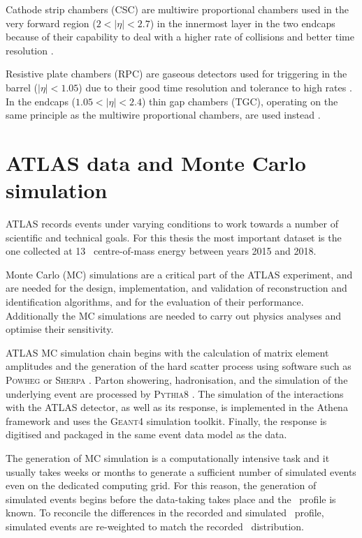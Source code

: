 Cathode strip chambers (CSC) are multiwire proportional chambers
used in the very forward region ($2 < |\eta| < 2.7$)
in the innermost layer in the two endcaps because of their capability
to deal with a higher rate of collisions and better time resolution
\cite{Aad:2010ag}.

Resistive plate chambers (RPC) are gaseous detectors used for
triggering in the barrel ($|\eta| < 1.05$) due to their good time resolution
and tolerance to high rates \cite{Cattani_2011}. In the endcaps ($1.05 < |\eta| < 2.4$)
thin gap chambers (TGC), operating on the same principle as the multiwire
proportional chambers, are used instead \cite{Nagai:1996mf}.

\section{ATLAS data and Monte Carlo simulation}

ATLAS records events under varying conditions to work towards a number of
scientific and technical goals. For this thesis the most important dataset
is the one collected at 13 \TeV~centre-of-mass energy between years 2015
and 2018.

Monte Carlo (MC) simulations are a critical part of the ATLAS experiment,
and are needed for the design, implementation, and validation of
reconstruction and identification algorithms, and for the evaluation
of their performance. Additionally the MC simulations are needed to
carry out physics analyses and optimise their sensitivity.

ATLAS MC simulation chain begins with the calculation of matrix element 
amplitudes and the generation of the hard scatter process using
software such as \textsc{Powheg} \cite{powheg, Frixione_2007, Alioli_2010}
or \textsc{Sherpa} \cite{sherpa1, sherpa2}. Parton showering, hadronisation,
and the simulation of the underlying event are processed by
\textsc{Pythia8} \cite{Sj_strand_2008}. The simulation of the
interactions with the ATLAS detector, as well as its response, is
implemented in the Athena framework \cite{Duckeck:2005rb} and uses the
\textsc{Geant4} \cite{Agostinelli:2002hh, 1610988, ALLISON2016186}
simulation toolkit. Finally, the response is digitised
and packaged in the same event data model \cite{Buckley_2015} as the
data.

The generation of MC simulation is a computationally intensive task
and it usually takes weeks or months to generate a sufficient number
of simulated events even on the dedicated computing grid. For this
reason, the generation of simulated events begins before the data-taking
takes place and the \pileup~profile is known. To reconcile the
differences in the recorded and simulated \pileup~profile, simulated
events are re-weighted to match the recorded \pileup~distribution.







